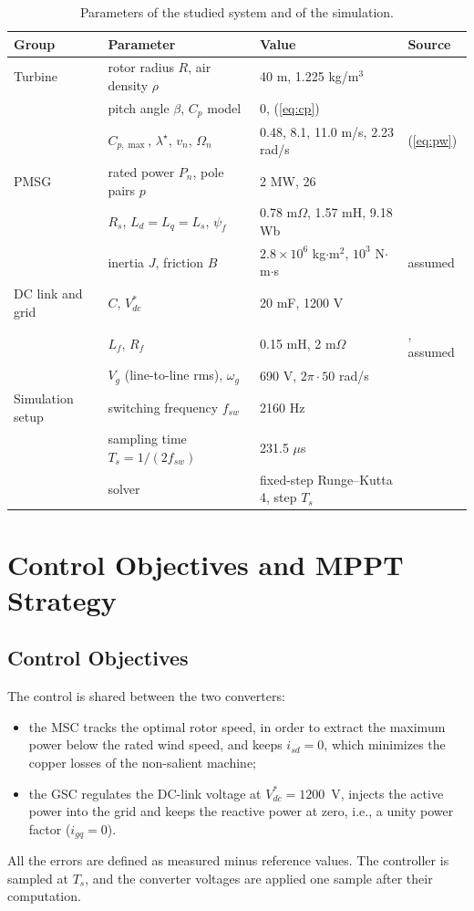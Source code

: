 \documentclass[11pt,a4paper]{article}
\begin{document}
\begin{table}[!htb]
\caption{Parameters of the studied system and of the simulation.}
\label{tab:param}
\centering
\setlength{\tabcolsep}{5pt}
\begin{tabular}{llll}
\toprule
Group & Parameter & Value & Source\\
\midrule
Turbine & rotor radius $R$, air density $\rho$ & 40 m, 1.225 kg/m$^3$ & \cite{rolan2009,aimene2022}\\
 & pitch angle $\beta$, $C_p$ model & 0, (\ref{eq:cp}) & \cite{heier2014}\\
 & $C_{p,\max}$, $\lambda^\star$, $v_n$, $\Omega_n$ & 0.48, 8.1, 11.0 m/s, 2.23 rad/s & (\ref{eq:pw})\\
PMSG & rated power $P_n$, pole pairs $p$ & 2 MW, 26 & \cite{hasan2021}\\
 & $R_s$, $L_d=L_q=L_s$, $\psi_f$ & 0.78 m$\Omega$, 1.57 mH, 9.18 Wb & \cite{hasan2021}\\
 & inertia $J$, friction $B$ & $2.8\times10^6$ kg$\cdot$m$^2$, $10^3$ N$\cdot$m$\cdot$s & assumed\\
DC link and grid & $C$, $V_{dc}^*$ & 20 mF, 1200 V & \cite{hasan2021}\\
 & $L_f$, $R_f$ & 0.15 mH, 2 m$\Omega$ & \cite{hasan2021}, assumed\\
 & $V_g$ (line-to-line rms), $\omega_g$ & 690 V, $2\pi\cdot50$ rad/s & \cite{hasan2021}\\
Simulation setup & switching frequency $f_{sw}$ & 2160 Hz & \cite{hasan2021}\\
 & sampling time $T_s=1/(2f_{sw})$ & 231.5 $\mu$s & \\
 & solver & fixed-step Runge--Kutta 4, step $T_s$ & \\
\bottomrule
\end{tabular}
\end{table}

\section{Control Objectives and MPPT Strategy}
\subsection{Control Objectives}
The control is shared between the two converters:
\begin{itemize}[leftmargin=*,itemsep=2pt]
\item the MSC tracks the optimal rotor speed, in order to extract the maximum power below the rated
wind speed, and keeps $i_{sd}=0$, which minimizes the copper losses of the non-salient machine;
\item the GSC regulates the DC-link voltage at $V_{dc}^*=1200$~V, injects the active power into the grid
and keeps the reactive power at zero, i.e., a unity power factor ($i_{gq}=0$).
\end{itemize}
All the errors are defined as measured minus reference values. The controller is sampled at $T_s$, and
the converter voltages are applied one sample after their computation.
\end{document}
